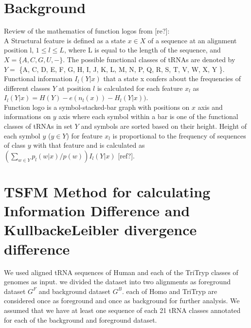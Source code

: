 \documentclass[table,
12pt, %
a4paper, %
oneside, %
headinclude,footinclude, %
BCOR5mm, %
]{scrartcl}
\title{\normalfont\spacedallcaps{}} %
\begin{document}
\renewcommand{\sectionmark}[1]{\markright{\spacedlowsmallcaps{#1}}} %
\lehead{\mbox{\llap{\small\thepage\kern1em\color{halfgray} \vline}\color{halfgray}\hspace{0.5em}\rightmark\hfil}} %
\pagestyle{scrheadings} %
\setcounter{tocdepth}{3} %
\newpage 
\section{Background}
Review of the mathematics of function logos from [re?]:\\
A Structural feature is defined as a state $x \in X$ of a sequence at an alignment position l, $1 \leqslant l \leqslant L$, where L is equal to the length of the sequence, and $X = \{A, C, G, U, - \}$. The possible functional classes of tRNAs are denoted by $Y =$ \{A, C, D, E, F, G, H, I, J, K, L, M, N, P, Q, R, S, T, V, W, X, Y \}. Functional information $I_l(Y|x)$ that a state x confers about the frequencies of different classes $Y$ at position $l$ is calculated for each feature $x_l$ as  $I_l(Y|x)=H(Y)-e(n_l(x))-H_l(Y|x))$.\\
Function logo is a symbol-stacked-bar graph with positions on $x$ axis and informations on $y$ axis where each symbol within a bar is one of the functional classes of tRNAs in set $Y$ and symbols are sorted based on their height. Height of each symbol $y$ ($y \in Y$) for feature $x_l$ is proportional to the frequency of sequences of class $y$ with that feature and is calculated as $(\sum_{w \in Y} p_l(w|x)/p(w)) I_l(Y|x)$  [ref?].\\
\section{TSFM Method for calculating Information Difference and KullbackeLeibler divergence difference}
We used aligned tRNA sequences of Human and  each of the TriTryp classes of genomes as input. we divided the dataset into two alignments as foreground dataset $G^F$ and background dataset $G^B$. each of Homo and TriTryp are considered once as foreground and once as background for further analysis. We assumed that we have at least one sequence of each 21 tRNA classes annotated for each of the background and foreground dataset.\\
\end{document}
